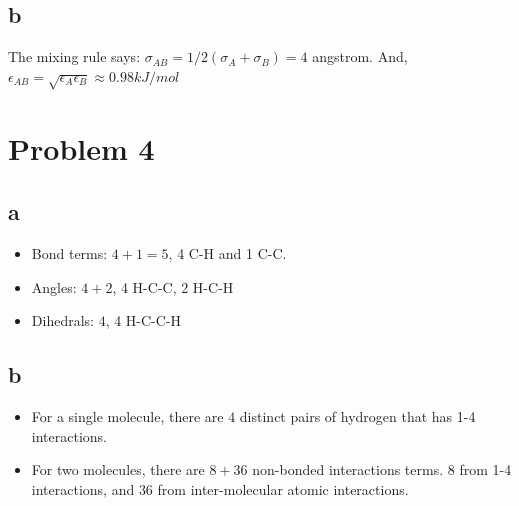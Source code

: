 \documentclass[11pt]{article}
\begin{document}
\subsection{b}
\label{sec:org38c55e3}
The mixing rule says: \(\sigma_{AB} = 1/2 (\sigma_{A} + \sigma_{B}) = 4\)
angstrom. And, \(\epsilon_{AB} = \sqrt{\epsilon_{A}\epsilon_{B}} \approx 0.98
kJ/mol\)

\section{Problem 4}
\label{sec:org63c8c31}
\subsection{a}
\label{sec:org5d3adec}
\begin{itemize}
\item Bond terms: \(4 + 1 = 5\), 4 C-H and 1 C-C.
\item Angles: \(4 + 2\), 4 H-C-C, 2 H-C-H
\item Dihedrals: \(4\), 4 H-C-C-H
\end{itemize}
\subsection{b}
\label{sec:org1f34a84}
\begin{itemize}
\item For a single molecule, there are \(4\) distinct pairs of hydrogen that has 1-4
interactions.
\item For two molecules, there are \(8 + 36\) non-bonded interactions terms. \(8\)
from 1-4 interactions, and \(36\) from inter-molecular atomic interactions.
\end{itemize}
\end{document}
